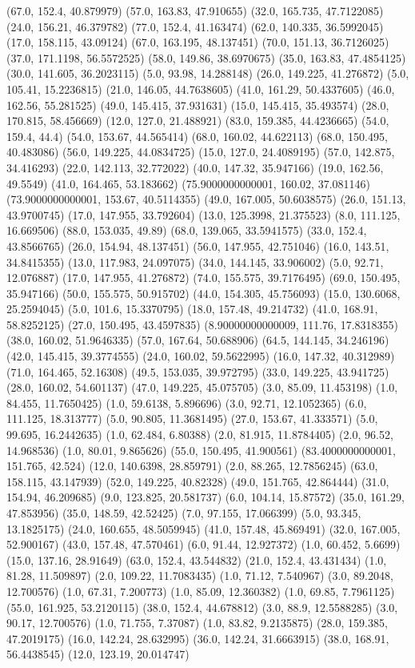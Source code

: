{(67.0, 152.4, 40.879979) (57.0, 163.83, 47.910655) (32.0, 165.735, 47.7122085) (24.0, 156.21, 46.379782) (77.0, 152.4, 41.163474) (62.0, 140.335, 36.5992045) (17.0, 158.115, 43.09124) (67.0, 163.195, 48.137451) (70.0, 151.13, 36.7126025) (37.0, 171.1198, 56.5572525) (58.0, 149.86, 38.6970675) (35.0, 163.83, 47.4854125) (30.0, 141.605, 36.2023115) (5.0, 93.98, 14.288148) (26.0, 149.225, 41.276872) (5.0, 105.41, 15.2236815) (21.0, 146.05, 44.7638605) (41.0, 161.29, 50.4337605) (46.0, 162.56, 55.281525) (49.0, 145.415, 37.931631) (15.0, 145.415, 35.493574) (28.0, 170.815, 58.456669) (12.0, 127.0, 21.488921) (83.0, 159.385, 44.4236665) (54.0, 159.4, 44.4) (54.0, 153.67, 44.565414) (68.0, 160.02, 44.622113) (68.0, 150.495, 40.483086) (56.0, 149.225, 44.0834725) (15.0, 127.0, 24.4089195) (57.0, 142.875, 34.416293) (22.0, 142.113, 32.772022) (40.0, 147.32, 35.947166) (19.0, 162.56, 49.5549) (41.0, 164.465, 53.183662) (75.9000000000001, 160.02, 37.081146) (73.9000000000001, 153.67, 40.5114355) (49.0, 167.005, 50.6038575) (26.0, 151.13, 43.9700745) (17.0, 147.955, 33.792604) (13.0, 125.3998, 21.375523) (8.0, 111.125, 16.669506) (88.0, 153.035, 49.89) (68.0, 139.065, 33.5941575) (33.0, 152.4, 43.8566765) (26.0, 154.94, 48.137451) (56.0, 147.955, 42.751046) (16.0, 143.51, 34.8415355) (13.0, 117.983, 24.097075) (34.0, 144.145, 33.906002) (5.0, 92.71, 12.076887) (17.0, 147.955, 41.276872) (74.0, 155.575, 39.7176495) (69.0, 150.495, 35.947166) (50.0, 155.575, 50.915702) (44.0, 154.305, 45.756093) (15.0, 130.6068, 25.2594045) (5.0, 101.6, 15.3370795) (18.0, 157.48, 49.214732) (41.0, 168.91, 58.8252125) (27.0, 150.495, 43.4597835) (8.90000000000009, 111.76, 17.8318355) (38.0, 160.02, 51.9646335) (57.0, 167.64, 50.688906) (64.5, 144.145, 34.246196) (42.0, 145.415, 39.3774555) (24.0, 160.02, 59.5622995) (16.0, 147.32, 40.312989) (71.0, 164.465, 52.16308) (49.5, 153.035, 39.972795) (33.0, 149.225, 43.941725) (28.0, 160.02, 54.601137) (47.0, 149.225, 45.075705) (3.0, 85.09, 11.453198) (1.0, 84.455, 11.7650425) (1.0, 59.6138, 5.896696) (3.0, 92.71, 12.1052365) (6.0, 111.125, 18.313777) (5.0, 90.805, 11.3681495) (27.0, 153.67, 41.333571) (5.0, 99.695, 16.2442635) (1.0, 62.484, 6.80388) (2.0, 81.915, 11.8784405) (2.0, 96.52, 14.968536) (1.0, 80.01, 9.865626) (55.0, 150.495, 41.900561) (83.4000000000001, 151.765, 42.524) (12.0, 140.6398, 28.859791) (2.0, 88.265, 12.7856245) (63.0, 158.115, 43.147939) (52.0, 149.225, 40.82328) (49.0, 151.765, 42.864444) (31.0, 154.94, 46.209685) (9.0, 123.825, 20.581737) (6.0, 104.14, 15.87572) (35.0, 161.29, 47.853956) (35.0, 148.59, 42.52425) (7.0, 97.155, 17.066399) (5.0, 93.345, 13.1825175) (24.0, 160.655, 48.5059945) (41.0, 157.48, 45.869491) (32.0, 167.005, 52.900167) (43.0, 157.48, 47.570461) (6.0, 91.44, 12.927372) (1.0, 60.452, 5.6699) (15.0, 137.16, 28.91649) (63.0, 152.4, 43.544832) (21.0, 152.4, 43.431434) (1.0, 81.28, 11.509897) (2.0, 109.22, 11.7083435) (1.0, 71.12, 7.540967) (3.0, 89.2048, 12.700576) (1.0, 67.31, 7.200773) (1.0, 85.09, 12.360382) (1.0, 69.85, 7.7961125) (55.0, 161.925, 53.2120115) (38.0, 152.4, 44.678812) (3.0, 88.9, 12.5588285) (3.0, 90.17, 12.700576) (1.0, 71.755, 7.37087) (1.0, 83.82, 9.2135875) (28.0, 159.385, 47.2019175) (16.0, 142.24, 28.632995) (36.0, 142.24, 31.6663915) (38.0, 168.91, 56.4438545) (12.0, 123.19, 20.014747) }
